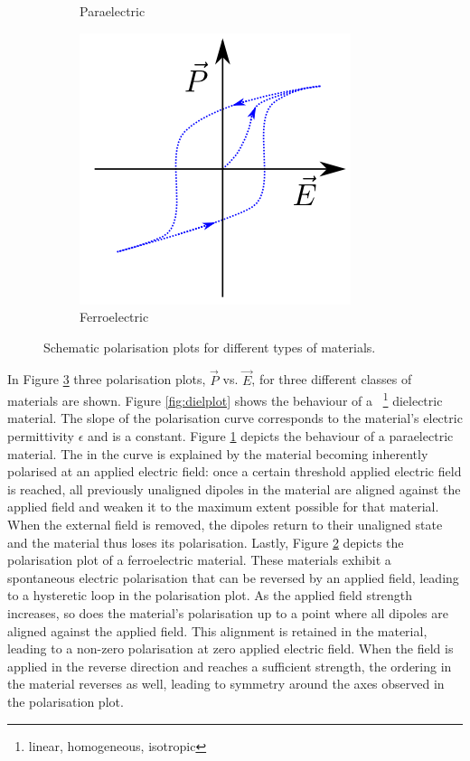 \begin{figure}
\begin{subfigure}{0.3\textwidth}
	\caption{Paraelectric}
	\label{fig:parelplot}
\end{subfigure}
\begin{subfigure}{0.3\textwidth}
\centering
	\includegraphics[width=0.9\linewidth]{./figs/chap1/ferelpolplot}
	\caption{Ferroelectric}
	\label{fig:ferelplot}
\end{subfigure}
\caption{Schematic polarisation plots for different types of materials.}
\label{fig:polplot}
\end{figure}
In Figure \ref{fig:polplot} three polarisation plots, $\vec{P}$ vs. $\vec{E}$, for three different classes of materials are shown. Figure \ref{fig:dielplot} shows the behaviour of a ~\footnote{\ie{} linear, homogeneous, isotropic} dielectric material. The slope of the polarisation curve corresponds to the material's electric permittivity $\epsilon$ and is a constant. Figure \ref{fig:parelplot} depicts the behaviour of a paraelectric material. The  in the curve is explained by the material becoming inherently polarised at an applied electric field: once a certain threshold applied electric field is reached, all previously unaligned dipoles in the material are aligned against the applied field and weaken it to the maximum extent possible for that material. When the external field is removed, the dipoles return to their unaligned state and the material thus loses its polarisation. Lastly, Figure \ref{fig:ferelplot} depicts the polarisation plot of a ferroelectric material. These materials exhibit a spontaneous electric polarisation that can be reversed by an applied field, leading to a hysteretic loop in the polarisation plot. As the applied field strength increases, so does the material's polarisation up to a point where all dipoles are aligned against the applied field. This alignment is retained in the material, leading to a non-zero polarisation at zero applied electric field. When the field is applied in the reverse direction and reaches a sufficient strength, the ordering in the material reverses as well, leading to symmetry around the axes observed in the polarisation plot.\\

